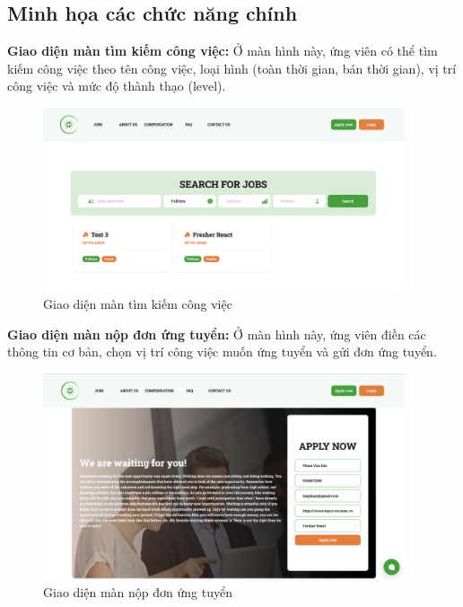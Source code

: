 \documentclass[../DoAn.tex]{subfiles}
\begin{document}
\subsection{Minh họa các chức năng chính}
\textbf{Giao diện màn tìm kiếm công việc:}
Ở màn hình này, ứng viên có thể tìm kiếm công việc theo tên công việc, loại hình (toàn thời gian, bán thời gian), vị trí công việc và mức độ thành thạo (level).
\begin{figure}[H]
    \centering
    \includegraphics[width=0.95\textwidth]{Hinhve/TimKiemCongViec.png}
    \caption{Giao diện màn tìm kiếm công việc}
\end{figure}

\textbf{Giao diện màn nộp đơn ứng tuyển:}
Ở màn hình này, ứng viên điền các thông tin cơ bản, chọn vị trí công việc muốn ứng tuyển và gửi đơn ứng tuyển.
\begin{figure}[H]
    \centering
    \includegraphics[width=0.95\textwidth]{Hinhve/DangKyUngTuyen.png}
    \caption{Giao diện màn nộp đơn ứng tuyển}
\end{figure}
\end{document}
